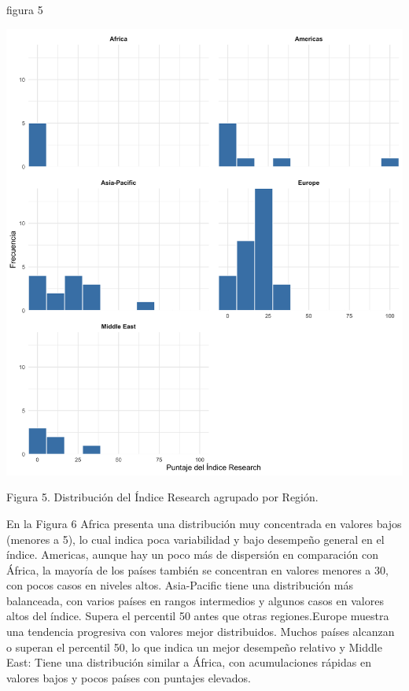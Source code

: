 \documentclass[
]{article}
\begin{document}
\begin{multicols}{2}

figura 5



\begin{center}
\includegraphics[width=\linewidth]{figura5.png}
\end{center}
Figura 5. Distribución del Índice Research agrupado por Región.

En la Figura 6 Africa presenta una distribución muy concentrada en valores bajos (menores a 5), lo cual indica poca variabilidad y bajo desempeño general en el índice. Americas, aunque hay un poco más de dispersión en comparación con África, la mayoría de los países también se concentran en valores menores a 30, con pocos casos en niveles altos. Asia-Pacific tiene una distribución más balanceada, con varios países en rangos intermedios y algunos casos en valores altos del índice. Supera el percentil 50 antes que otras regiones.Europe muestra una tendencia progresiva con valores mejor distribuidos. Muchos países alcanzan o superan el percentil 50, lo que indica un mejor desempeño relativo y Middle East: Tiene una distribución similar a África, con acumulaciones rápidas en valores bajos y pocos países con puntajes elevados.


\end{multicols}
\end{document}

